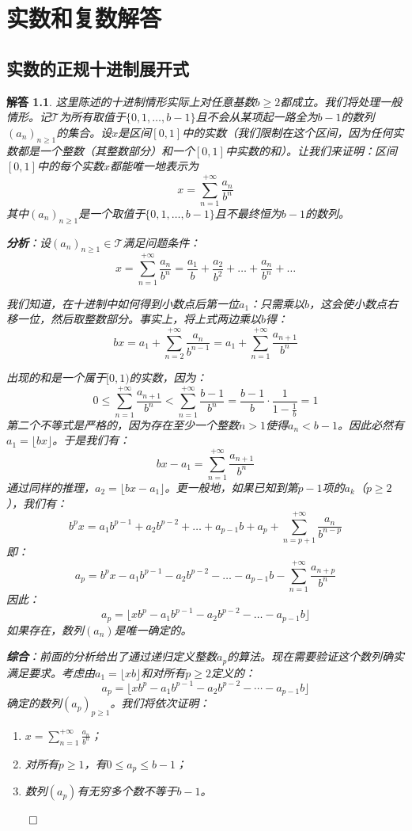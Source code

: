 \documentclass[12pt,UTF8]{ctexbook}
\theoremstyle{exercisestyle}
\theoremstyle{solutionstyle}
\newtheorem*{solution*}{解答}
\newenvironment{solution}
  {\begin{solution*}}
  {\hfill\ensuremath{\qed}\end{solution*}}
\begin{document}
\appendix


\chapter{实数和复数解答}
\section{实数的正规十进制展开式}
\begin{solution}
这里陈述的十进制情形实际上对任意基数$b \geq 2$都成立。我们将处理一般情形。记$\mathcal T$为所有取值于$\{0,1,\ldots,b-1\}$且不会从某项起一路全为$b-1$的数列$(a_n)_{n\geq 1}$的集合。设$x$是区间$[0,1]$中的实数（我们限制在这个区间，因为任何实数都是一个整数（其整数部分）和一个$[0,1]$中实数的和）。让我们来证明：区间$[0,1]$中的每个实数$x$都能唯一地表示为
$$x = \sum_{n=1}^{+\infty} \frac{a_n}{b^n}$$
其中$(a_n)_{n \geq 1}$是一个取值于$\{0,1,\ldots,b-1\}$且不最终恒为$b-1$的数列。

\textbf{分析}：设$(a_n)_{n\geqslant 1} \in \mathcal T$满足问题条件：
$$x = \sum_{n=1}^{+\infty} \frac{a_n}{b^n} = \frac{a_1}{b} + \frac{a_2}{b^2} + \dots + \frac{a_n}{b^n} + \dots$$

我们知道，在十进制中如何得到小数点后第一位$a_1$：只需乘以$b$，这会使小数点右移一位，然后取整数部分。事实上，将上式两边乘以$b$得：
$$bx = a_1 + \sum_{n=2}^{+\infty} \frac{a_n}{b^{n-1}} = a_1 + \sum_{n=1}^{+\infty} \frac{a_{n+1}}{b^n}$$

出现的和是一个属于$[0,1)$的实数，因为：
$$0 \leqslant \sum_{n=1}^{+\infty} \frac{a_{n+1}}{b^n} < \sum_{n=1}^{+\infty} \frac{b-1}{b^n} = \frac{b-1}{b} \cdot \frac{1}{1 - \frac{1}{b}} = 1$$
第二个不等式是严格的，因为存在至少一个整数$n > 1$使得$a_n < b - 1$。因此必然有$a_1 = \lfloor bx \rfloor$。于是我们有：
$$bx - a_1 = \sum_{n=1}^{+\infty} \frac{a_{n+1}}{b^n}$$
通过同样的推理，$a_2 = \lfloor bx - a_1 \rfloor$。更一般地，如果已知到第$p-1$项的$a_k$（$p \geqslant 2$），我们有：
$$b^p x = a_1 b^{p-1} + a_2 b^{p-2} + \dots + a_{p-1} b + a_p + \sum_{n=p+1}^{+\infty} \frac{a_n}{b^{n-p}}$$
即：
$$a_p = b^p x - a_1 b^{p-1} - a_2 b^{p-2} - \dots - a_{p-1} b - \sum_{n=1}^{+\infty} \frac{a_{n+p}}{b^n}$$
因此：
$$a_p = \lfloor x b^p - a_1 b^{p-1} - a_2 b^{p-2} - \dots - a_{p-1} b \rfloor$$
如果存在，数列$(a_n)$是唯一确定的。

\textbf{综合}：前面的分析给出了通过递归定义整数$a_p$的算法。现在需要验证这个数列确实满足要求。考虑由$a_1 = \lfloor xb \rfloor$和对所有$p \ge 2$定义的：
$$a_p = \lfloor xb^p - a_1b^{p-1} - a_2b^{p-2} - \cdots - a_{p-1}b \rfloor$$
确定的数列$(a_p)_{p\geq 1}$。我们将依次证明：
\begin{enumerate}
    \item $x = \sum_{n=1}^{+\infty} \frac{a_n}{b^n}$；
    \item 对所有$p \geqslant 1$，有$0 \leqslant a_p \leqslant b - 1$；
    \item 数列$(a_p)$有无穷多个数不等于$b - 1$。
\end{enumerate}


\end{solution}
\end{document}
